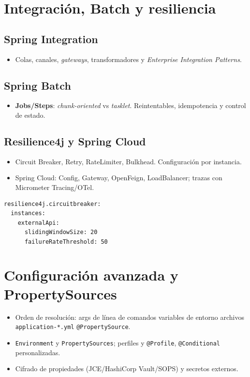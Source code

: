 \documentclass[11pt,a4paper]{article}
\begin{document}
\section{Integración, Batch y resiliencia}
\subsection{Spring Integration}
\begin{itemize}[leftmargin=*]
  \item Colas, canales, \emph{gateways}, transformadores y \emph{Enterprise Integration Patterns}.
\end{itemize}

\subsection{Spring Batch}
\begin{itemize}[leftmargin=*]
  \item \textbf{Jobs/Steps}: \emph{chunk-oriented} vs \emph{tasklet}. Reintentables, idempotencia y control de estado.
\end{itemize}

\subsection{Resilience4j y Spring Cloud}
\begin{itemize}[leftmargin=*]
  \item Circuit Breaker, Retry, RateLimiter, Bulkhead. Configuración por instancia.
  \item Spring Cloud: Config, Gateway, OpenFeign, LoadBalancer; trazas con Micrometer Tracing/OTel.
\end{itemize}

\begin{lstlisting}[style=yamlstyle, caption={Resilience4j por instancia}] 
resilience4j.circuitbreaker:
  instances:
    externalApi:
      slidingWindowSize: 20
      failureRateThreshold: 50
\end{lstlisting}

\section{Configuración avanzada y PropertySources}
\begin{itemize}[leftmargin=*]
  \item Orden de resolución: args de línea de comandos \textrightarrow{} variables de entorno \textrightarrow{} archivos \texttt{application-*.yml} \textrightarrow{} \texttt{@PropertySource}.
  \item \texttt{Environment} y \texttt{PropertySources}; perfiles y \texttt{@Profile}, \texttt{@Conditional} personalizadas.
  \item Cifrado de propiedades (JCE/HashiCorp Vault/SOPS) y secretos externos.
\end{itemize}
\end{document}
